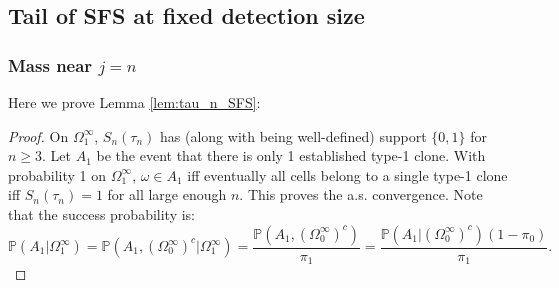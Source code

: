 \documentclass{article}
\numberwithin{equation}{section}
\begin{document}
\subsection{Tail of SFS at fixed detection size}
\subsubsection{Mass near $j=n$}\label{app:tau_n_SFS}
Here we prove Lemma \ref{lem:tau_n_SFS}:
\TauNSFS*
\begin{proof}

On $\Omega_1^\infty$, $S_n(\tau_n)$ has (along with being well-defined) support $\{0,1\}$ for $n\geq 3$. Let $A_1$ be the event that there is only 1 established type-1 clone. With probability 1 on $\Omega_1^\infty$, $\omega\in A_1$ iff eventually all cells belong to a single type-1 clone iff $S_n(\tau_n)=1$ for all large enough $n$. This proves the a.s. convergence. Note that the success probability is:
    \[\mathbb{P}(A_1|\Omega_1^\infty)=\mathbb{P}(A_1,\left(\Omega_0^\infty\right)^c|\Omega_1^\infty)=\frac{\mathbb{P}(A_1,(\Omega_0^\infty)^c)}{\pi_1}=\frac{\mathbb{P}(A_1|(\Omega_0^\infty)^c)(1-\pi_0)}{\pi_1}.\]

    


\end{proof}
\end{document}
